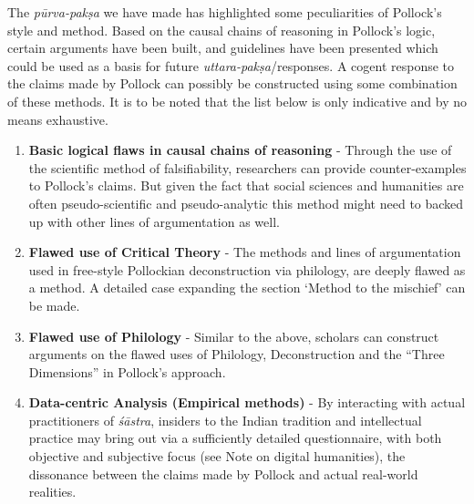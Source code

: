 The {\sl pūrva-pakṣa} we have made has highlighted some peculiarities of Pollock's style and method. Based on the causal chains of reasoning in Pollock's logic, certain arguments have been built, and guidelines have been presented which could be used as a basis for future {\sl uttara-pakṣa}/responses. A cogent response to the claims made by Pollock can possibly be constructed using some combination of these methods. It is to be noted that the list below is only indicative and by no means exhaustive.
\begin{enumerate}
\item {\bf Basic logical flaws in causal chains of reasoning} - Through the use of the scientific method of falsifiability, researchers can provide counter-examples to Pollock's claims.  But given the fact that social sciences and humanities are often pseudo-scientific and pseudo-analytic this method might need to backed up with other lines of argumentation as well.

\item {\bf Flawed use of Critical Theory} - The methods and lines of argumentation used in free-style Pollockian deconstruction via philology, are deeply flawed as a method. A detailed case expanding the section `Method to the mischief' can be made. 

\item {\bf Flawed use of Philology} - Similar to the above, scholars can construct arguments on the flawed uses of Philology, Deconstruction and the ``Three Dimensions'' in Pollock's approach.

\item {\bf Data-centric Analysis (Empirical methods)} - By interacting with actual practitioners of {\sl śāstra}, insiders to the Indian tradition and intellectual practice may bring out via a sufficiently detailed questionnaire, with both objective and subjective focus (see Note on digital humanities), the dissonance between the claims made by Pollock and  actual real-world realities.


\end{enumerate}
